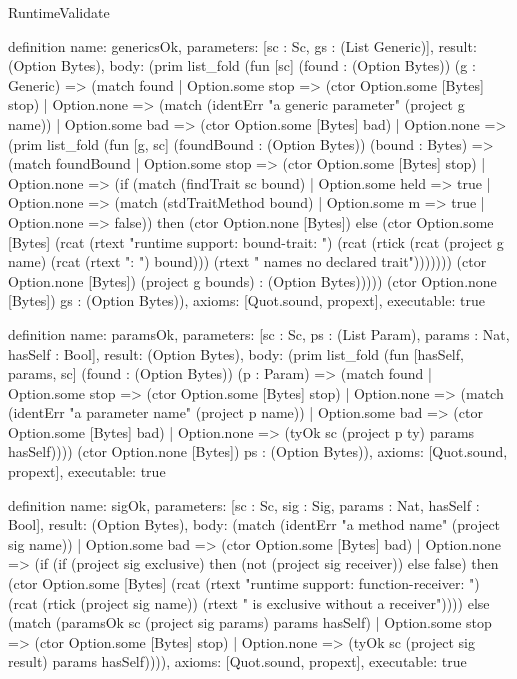 \begin{lexlean}{RuntimeValidate}
\begin{semanticmodule}
definition{
  name: genericsOk,
  parameters: [sc : Sc, gs : (List Generic)],
  result: (Option Bytes),
  body: (prim list_fold (fun [sc] (found : (Option Bytes)) (g : Generic) => (match found
    | Option.some stop => (ctor Option.some [Bytes] stop)
    | Option.none => (match (identErr "a generic parameter" (project g name))
      | Option.some bad => (ctor Option.some [Bytes] bad)
      | Option.none => (prim list_fold (fun [g, sc] (foundBound : (Option Bytes)) (bound : Bytes) => (match foundBound
        | Option.some stop => (ctor Option.some [Bytes] stop)
        | Option.none => (if (match (findTrait sc bound)
          | Option.some held => true
          | Option.none => (match (stdTraitMethod bound)
            | Option.some m => true
            | Option.none => false)) then (ctor Option.none [Bytes]) else (ctor Option.some [Bytes] (rcat (rtext "runtime support: bound-trait: ") (rcat (rtick (rcat (project g name) (rcat (rtext ": ") bound))) (rtext " names no declared trait"))))))) (ctor Option.none [Bytes]) (project g bounds) : (Option Bytes))))) (ctor Option.none [Bytes]) gs : (Option Bytes)),
  axioms: [Quot.sound, propext],
  executable: true
}

definition{
  name: paramsOk,
  parameters: [sc : Sc, ps : (List Param), params : Nat, hasSelf : Bool],
  result: (Option Bytes),
  body: (prim list_fold (fun [hasSelf, params, sc] (found : (Option Bytes)) (p : Param) => (match found
    | Option.some stop => (ctor Option.some [Bytes] stop)
    | Option.none => (match (identErr "a parameter name" (project p name))
      | Option.some bad => (ctor Option.some [Bytes] bad)
      | Option.none => (tyOk sc (project p ty) params hasSelf)))) (ctor Option.none [Bytes]) ps : (Option Bytes)),
  axioms: [Quot.sound, propext],
  executable: true
}

definition{
  name: sigOk,
  parameters: [sc : Sc, sig : Sig, params : Nat, hasSelf : Bool],
  result: (Option Bytes),
  body: (match (identErr "a method name" (project sig name))
    | Option.some bad => (ctor Option.some [Bytes] bad)
    | Option.none => (if (if (project sig exclusive) then (not (project sig receiver)) else false) then (ctor Option.some [Bytes] (rcat (rtext "runtime support: function-receiver: ") (rcat (rtick (project sig name)) (rtext " is exclusive without a receiver")))) else (match (paramsOk sc (project sig params) params hasSelf)
      | Option.some stop => (ctor Option.some [Bytes] stop)
      | Option.none => (tyOk sc (project sig result) params hasSelf)))),
  axioms: [Quot.sound, propext],
  executable: true
}


\end{semanticmodule}
\end{lexlean}
